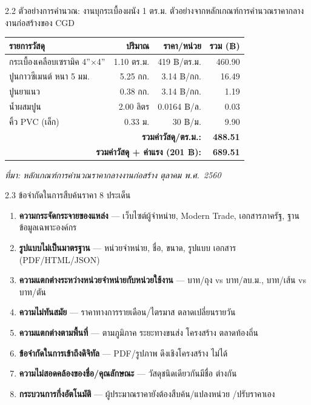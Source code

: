 \documentclass[aspectratio=169,11pt]{beamer}
\begin{document}
\begin{frame}{2.2 ตัวอย่างการคำนวณ: งานบุกระเบื้องผนัง 1 ตร.ม.}
  ตัวอย่างจากหลักเกณฑ์การคำนวณราคากลางงานก่อสร้างของ CGD
  \begin{table}
    \centering
    \footnotesize
    \begin{tabularx}{\textwidth}{X r r r}
      \toprule
      \textbf{รายการวัสดุ} & \textbf{ปริมาณ} & \textbf{ราคา/หน่วย} & \textbf{รวม (฿)} \\
      \midrule
      กระเบื้องเคลือบเซรามิค 4''$\times$4''     & 1.10 ตร.ม. & 419 ฿/ตร.ม. & 460.90 \\
      ปูนกาวซีเมนต์ หนา 5 มม.                  & 5.25 กก.   & 3.14 ฿/กก.  &  16.49 \\
      ปูนยาแนว                                & 0.38 กก.   & 3.14 ฿/กก.  &   1.19 \\
      น้ำผสมปูน                               & 2.00 ลิตร  & 0.0164 ฿/ล. &   0.03 \\
      คิ้ว PVC (เล็ก)                          & 0.33 ม.    & 30 ฿/ม.     &   9.90 \\
      \midrule
      \multicolumn{3}{r}{\textbf{รวมค่าวัสดุ/ตร.ม.:}} & \textbf{488.51} \\
      \multicolumn{3}{r}{\textbf{รวมค่าวัสดุ + ค่าแรง (201 ฿):}} & \textbf{689.51} \\
      \bottomrule
    \end{tabularx}
  \end{table}
  \footnotesize\emph{ที่มา: หลักเกณฑ์การคำนวณราคากลางงานก่อสร้าง ตุลาคม พ.ศ.~2560}
\end{frame}

\begin{frame}{2.3 ข้อจำกัดในการสืบค้นราคา 8 ประเด็น}
  \footnotesize
  \begin{enumerate}
    \item \textbf{ความกระจัดกระจายของแหล่ง} --- เว็บไซต์ผู้จำหน่าย, Modern Trade,
          เอกสารภาครัฐ, ฐานข้อมูลเฉพาะองค์กร
    \item \textbf{รูปแบบไม่เป็นมาตรฐาน} --- หน่วยจำหน่าย, ชื่อ, ขนาด, รูปแบบ
          เอกสาร (PDF/HTML/JSON)
    \item \textbf{ความแตกต่างระหว่างหน่วยจำหน่ายกับหน่วยใช้งาน} --- บาท/ถุง vs
          บาท/ลบ.ม., บาท/เส้น vs บาท/ตัน
    \item \textbf{ความไม่ทันสมัย} --- ราคาทางการรายเดือน/ไตรมาส ตลาดเปลี่ยนรายวัน
    \item \textbf{ความแตกต่างตามพื้นที่} --- ตามภูมิภาค ระยะทางขนส่ง โครงสร้าง
          ตลาดท้องถิ่น
    \item \textbf{ข้อจำกัดในการเข้าถึงดิจิทัล} --- PDF/รูปภาพ ดึงเชิงโครงสร้าง
          ไม่ได้
    \item \textbf{ความไม่สอดคล้องของชื่อ/คุณลักษณะ} --- วัสดุชนิดเดียวกันมีชื่อ
          ต่างกัน
    \item \textbf{กระบวนการกึ่งอัตโนมัติ} --- ผู้ประมาณราคายังต้องสืบค้น/แปลงหน่วย
          /ปรับราคาเอง
  \end{enumerate}
\end{frame}
\end{document}
